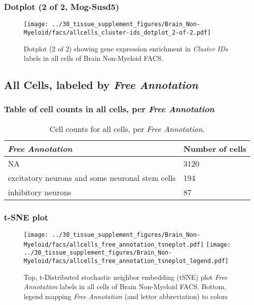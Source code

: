 \clearpage

\subsubsection{Dotplot (2 of 2, Mog-Susd5)}
\begin{figure}[h]
\centering
\texttt{[image: ../30\_tissue\_supplement\_figures/Brain\_Non-Myeloid/facs/allcells\_cluster-ids\_dotplot\_2-of-2.pdf]}

\caption{ Dotplot (2 of 2)  showing gene expression enrichment in \emph{Cluster IDs} labels in all cells of Brain Non-Myeloid FACS. }
\end{figure}


\clearpage

\subsection{All Cells, labeled by \emph{Free Annotation}}
\subsubsection{Table of cell counts in all cells, per \emph{Free Annotation}}\begin{table}[h]
\centering
\label{my-label}
\begin{tabular}{@{}ll@{}}
\toprule

\emph{Free Annotation}& Number of cells \\ \midrule
NA & 3120 \\

excitatory neurons and some neuronal stem cells & 194 \\

inhibitory neurons & 87 \\
\bottomrule
\end{tabular}
\caption{Cell counts for all cells, per \emph{Free Annotation}.}
\end{table}

\clearpage
\subsubsection{t-SNE plot}
\begin{figure}[h]
\centering
\texttt{[image: ../30\_tissue\_supplement\_figures/Brain\_Non-Myeloid/facs/allcells\_free\_annotation\_tsneplot.pdf]}
\texttt{[image: ../30\_tissue\_supplement\_figures/Brain\_Non-Myeloid/facs/allcells\_free\_annotation\_tsneplot\_legend.pdf]}
\caption{Top, t-Distributed stochastic neighbor embedding (tSNE) plot  \emph{Free Annotation} labels in all cells of Brain Non-Myeloid FACS. Bottom, legend mapping \emph{Free Annotation} (and letter abbreviation) to colors}
\end{figure}


